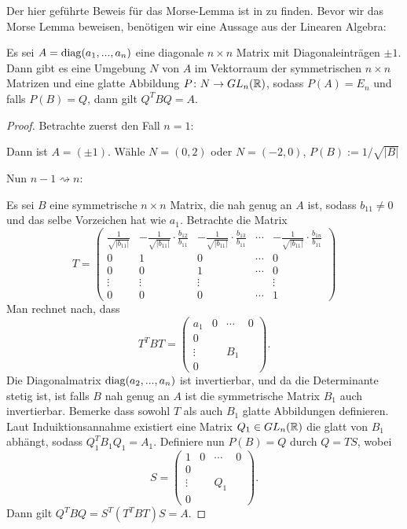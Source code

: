 Der hier geführte Beweis für das Morse-Lemma ist in \cite{hirsch} zu finden. 
Bevor wir das Morse Lemma beweisen, benötigen wir eine Aussage aus der Linearen Algebra:

\begin{lemma}
    \label{lemma: lina lemma}
    Es sei $A = { \operatorname{diag} }(a_1, ..., a_n)$ eine diagonale $n \times n$ Matrix mit 
    Diagonaleinträgen $\pm 1$. Dann gibt es eine Umgebung $N$ von $A$ im Vektorraum der 
    symmetrischen $n \times n$ Matrizen und eine glatte Abbildung 
    $P \colon N \to GL_n({ \mathbb R })$, sodass $P(A) = E_n$ und falls $P(B) = Q$, dann gilt 
    $Q^TBQ = A$.
\end{lemma}

\begin{proof}
    Betrachte zuerst den Fall $n = 1$:

    Dann ist $A = (\pm 1)$. Wähle $N = (0, 2)$ oder $N = (-2, 0)$, $P(B) := 1/\sqrt{|B|}$

    Nun $n - 1 \rightsquigarrow n$:

    Es sei $B$ eine symmetrische $n \times n$ Matrix, die nah genug an $A$ ist, sodass
    $b_{11} \neq 0$ und das selbe Vorzeichen hat wie $a_1$. Betrachte die Matrix 
    \[ T = \begin{pmatrix}
        \frac{1}{\sqrt{|b_{11}|}} & 
            - \frac{1}{\sqrt{|b_{11}|}} \cdot \frac{b_{12}}{b_{11}} & 
            - \frac{1}{\sqrt{|b_{11}|}} \cdot \frac{b_{13}}{b_{11}} & \cdots & 
            - \frac{1}{\sqrt{|b_{11}|}} \cdot \frac{b_{1n}}{b_{11}} \\
        0 & 1 & 0 & \cdots & 0 \\
        0 & 0 & 1 & \cdots & 0 \\
        \vdots & \vdots & \vdots & & \vdots \\
        0 & 0 & 0 & \cdots & 1 
    \end{pmatrix} \]
    Man rechnet nach, dass 
    \[ T^T B T = \begin{pmatrix}
        a_1 & 0 & \cdots & 0 \\
        0 & & & \\
        \vdots & & B_1 & \\
        0 & & &
    \end{pmatrix}. \]
    Die Diagonalmatrix ${ \operatorname{diag} }(a_2, ..., a_n)$ ist invertierbar, und da die 
    Determinante stetig ist, ist falls $B$ nah genug an $A$ ist die symmetrische Matrix 
    $B_1$ auch invertierbar. Bemerke dass sowohl $T$ als auch $B_1$ glatte Abbildungen
    definieren. Laut Induiktionsannahme existiert eine Matrix 
    $Q_1 \in GL_n({ \mathbb R })$ die glatt von $B_1$ abhängt, sodass $Q_1^T B_1 Q_1 = A_1$.
    Definiere nun $P(B) = Q$ durch $Q = TS$, wobei
    \[ S = \begin{pmatrix}
        1 & 0 & \cdots & 0 \\
        0 & & & \\
        \vdots & & Q_1 & \\
        0 & & &
    \end{pmatrix}. \]
    Dann gilt $Q^TBQ = S^T (T^T B T) S = A$.
\end{proof}

